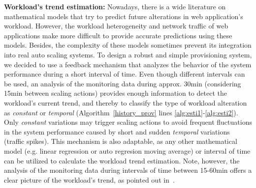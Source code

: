 \textbf{Workload's trend estimation:} Nowadays, there is a wide
literature on mathematical models that try to predict future
alterations in web application's workload. However, the workload
heterogeneity and network traffic of web applications make more
difficult to provide accurate predictions using these models. Besides,
the complexity of these models sometimes prevent its integration into
real auto scaling systems. To design a robust and simple provisioning
system, we decided to use a feedback mechanism that analyzes the
behavior of the system performance during a short interval of
time. Even though different intervals can be used, an analysis of the
monitoring data during approx. 30min (considering 15min between
scaling actions) provides enough information to detect the workload's
current trend, and thereby to classify the type of workload alteration
as \emph{constant} or \emph{temporal} (Algorithm~\ref{history_prov}
lines \ref{alg:esti1}-\ref{alg:esti2}). Only \emph{constant}
variations may trigger scaling actions to avoid frequent fluctuations
in the system performance caused by short and sudden \emph{temporal}
variations (traffic spikes). This mechanism is also adaptable, as any
other mathematical model (e.g. linear regression or auto regresion
moving average) or interval of time can be utilized to calculate the
workload trend estimation. Note, however, the analysis of the
monitoring data during intervals of time between 15-60min offers a
clear picture of the workload's trend, as pointed out
in~\cite{gandhi_hybrid_2012}.


